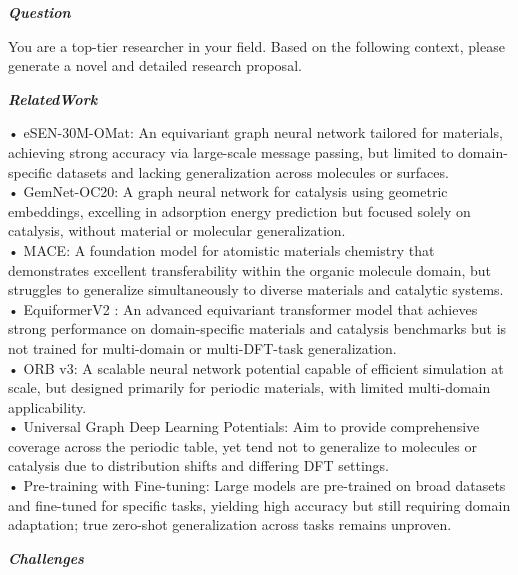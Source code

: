 \begin{tcolorbox}[
    breakable,
    title={Example of Idea Generation in Physics},
    colback=LighterGray,
    colframe=DeepPurple,
    colbacktitle=DeepPurple,
    coltitle=White,
]
\textbf{\emph{\textcolor{DeepPurple}{Question}}}

You are a top-tier researcher in your field. Based on the following context, please generate a novel and detailed research proposal.

\textbf{\emph{\textcolor{CaseOrange}{RelatedWork}}}

• eSEN-30M-OMat: An equivariant graph neural network tailored for materials, achieving strong accuracy via large-scale message passing, but limited to domain-specific datasets and lacking generalization across molecules or surfaces. \\
• GemNet-OC20: A graph neural network for catalysis using geometric embeddings, excelling in adsorption energy prediction but focused solely on catalysis, without material or molecular generalization. \\
• MACE: A foundation model for atomistic materials chemistry that demonstrates excellent transferability within the organic molecule domain, but struggles to generalize simultaneously to diverse materials and catalytic systems. \\
• EquiformerV2 : An advanced equivariant transformer model that achieves strong performance on domain-specific materials and catalysis benchmarks but is not trained for multi-domain or multi-DFT-task generalization. \\
• ORB v3: A scalable neural network potential capable of efficient simulation at scale, but designed primarily for periodic materials, with limited multi-domain applicability. \\
• Universal Graph Deep Learning Potentials: Aim to provide comprehensive coverage across the periodic table, yet tend not to generalize to molecules or catalysis due to distribution shifts and differing DFT settings. \\
• Pre-training with Fine-tuning: Large models are pre-trained on broad datasets and fine-tuned for specific tasks, yielding high accuracy but still requiring domain adaptation; true zero-shot generalization across tasks remains unproven. 

\textbf{\emph{\textcolor{CaseOrange}{Challenges}}}


\end{tcolorbox}
